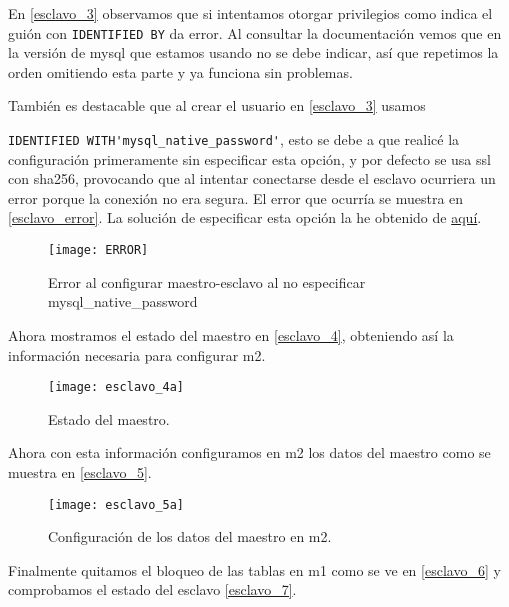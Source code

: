 En \eqref{esclavo_3} observamos que si intentamos otorgar privilegios como indica el guión con \verb|IDENTIFIED BY| da error. Al consultar la documentación vemos que en la versión de mysql que estamos usando no se debe indicar, así que repetimos la orden omitiendo esta parte y ya funciona sin problemas.

También es destacable que al crear el usuario en \eqref{esclavo_3} usamos

\verb|IDENTIFIED WITH'mysql_native_password'|, esto se debe a que realicé la configuración primeramente sin especificar esta opción, y por defecto se usa ssl con sha256, provocando que al intentar conectarse desde el esclavo ocurriera un error porque la conexión no era segura. El error que ocurría se muestra en \eqref{esclavo_error}. La solución de especificar esta opción la he obtenido de \href{https://stdworkflow.com/927/2061-authentication-plugin-caching-sha2-password-reported-error-authentication-require-secure-connection)}{aquí}.

\begin{figure}[h!]
\begin{center}
\caption{Error al configurar maestro-esclavo al no especificar mysql\_native\_password}
\label{esclavo_error}
\texttt{[image: ERROR]}
\end{center}
\end{figure}

Ahora mostramos el estado del maestro en \eqref{esclavo_4}, obteniendo así la información necesaria para configurar m2.

\begin{figure}[h!]
\begin{center}
\caption{Estado del maestro.}
\label{esclavo_4}
\texttt{[image: esclavo\_4a]}
\end{center}
\end{figure}

Ahora con esta información configuramos en m2 los datos del maestro como se muestra en \eqref{esclavo_5}.

\begin{figure}[h!]
\begin{center}
\caption{Configuración de los datos del maestro en m2.}
\label{esclavo_5}
\texttt{[image: esclavo\_5a]}
\end{center}
\end{figure}

Finalmente quitamos el bloqueo de las tablas en m1 como se ve en \eqref{esclavo_6} y comprobamos el estado del esclavo \eqref{esclavo_7}.

